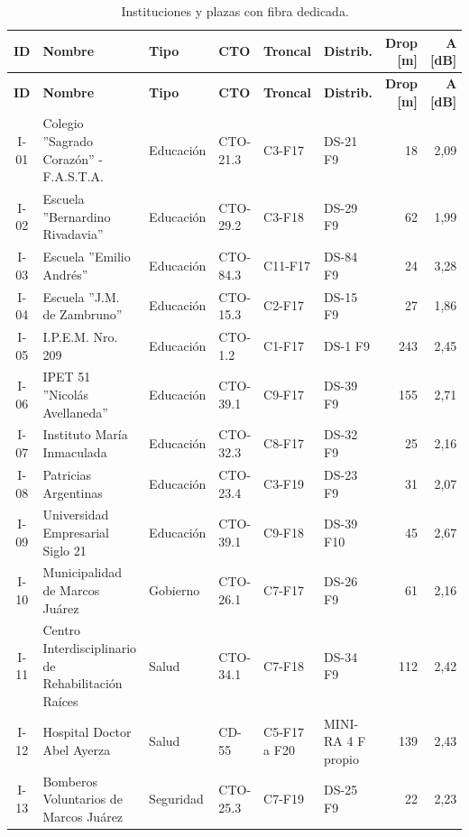 \footnotesize\setlength{\tabcolsep}{3pt}
\begin{longtable}{|c|>{\raggedright\arraybackslash}p{3.3cm}|l|l|>{\raggedright\arraybackslash}p{1.6cm}|>{\raggedright\arraybackslash}p{1.9cm}|r|r|}
\caption{Instituciones y plazas con fibra dedicada.}\label{tab:instituciones}\\ \hline
\textbf{ID} & \textbf{Nombre} & \textbf{Tipo} & \textbf{CTO} & \textbf{Troncal} & \textbf{Distrib.} & \textbf{Drop [m]} & \textbf{A [dB]} \\ \hline \endfirsthead
\hline \textbf{ID} & \textbf{Nombre} & \textbf{Tipo} & \textbf{CTO} & \textbf{Troncal} & \textbf{Distrib.} & \textbf{Drop [m]} & \textbf{A [dB]} \\ \hline \endhead
I-01 & Colegio ''Sagrado Corazón'' - F.A.S.T.A. & Educación & CTO-21.3 & C3-F17 & DS-21 F9 & 18 & 2{,}09 \\ \hline
I-02 & Escuela ''Bernardino Rivadavia'' & Educación & CTO-29.2 & C3-F18 & DS-29 F9 & 62 & 1{,}99 \\ \hline
I-03 & Escuela ''Emilio Andrés'' & Educación & CTO-84.3 & C11-F17 & DS-84 F9 & 24 & 3{,}28 \\ \hline
I-04 & Escuela ''J.M. de Zambruno'' & Educación & CTO-15.3 & C2-F17 & DS-15 F9 & 27 & 1{,}86 \\ \hline
I-05 & I.P.E.M. Nro. 209 & Educación & CTO-1.2 & C1-F17 & DS-1 F9 & 243 & 2{,}45 \\ \hline
I-06 & IPET 51 ''Nicolás Avellaneda'' & Educación & CTO-39.1 & C9-F17 & DS-39 F9 & 155 & 2{,}71 \\ \hline
I-07 & Instituto María Inmaculada & Educación & CTO-32.3 & C8-F17 & DS-32 F9 & 25 & 2{,}16 \\ \hline
I-08 & Patricias Argentinas & Educación & CTO-23.4 & C3-F19 & DS-23 F9 & 31 & 2{,}07 \\ \hline
I-09 & Universidad Empresarial Siglo 21 & Educación & CTO-39.1 & C9-F18 & DS-39 F10 & 45 & 2{,}67 \\ \hline
I-10 & Municipalidad de Marcos Juárez & Gobierno & CTO-26.1 & C7-F17 & DS-26 F9 & 61 & 2{,}16 \\ \hline
I-11 & Centro Interdisciplinario de Rehabilitación Raíces & Salud & CTO-34.1 & C7-F18 & DS-34 F9 & 112 & 2{,}42 \\ \hline
I-12 & Hospital Doctor Abel Ayerza & Salud & CD-55 & C5-F17 a F20 & MINI-RA 4 F propio & 139 & 2{,}43 \\ \hline
I-13 & Bomberos Voluntarios de Marcos Juárez & Seguridad & CTO-25.3 & C7-F19 & DS-25 F9 & 22 & 2{,}23 \\ \hline

\end{longtable}
